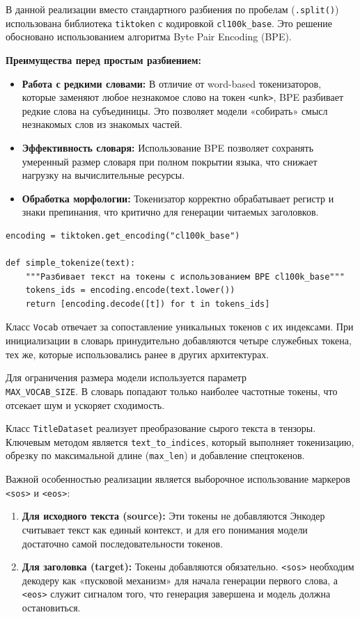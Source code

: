 \documentclass[coursework]{SCWorks}
\begin{document}
    В данной реализации вместо стандартного разбиения по пробелам (\texttt{.split()}) использована библиотека \texttt{tiktoken}
    с кодировкой \texttt{cl100k\_base}.
    Это решение обосновано использованием алгоритма Byte Pair Encoding (BPE).

    \textbf{Преимущества перед простым разбиением:}
    \begin{itemize}
        \item \textbf{Работа с редкими словами:} В отличие от word-based токенизаторов, которые заменяют любое незнакомое слово на токен \texttt{<unk>}, BPE разбивает редкие слова на субъединицы. Это позволяет модели «собирать» смысл незнакомых слов из знакомых частей.
        \item \textbf{Эффективность словаря:} Использование BPE позволяет сохранять умеренный размер словаря при полном покрытии языка, что снижает нагрузку на вычислительные ресурсы.
        \item \textbf{Обработка морфологии:} Токенизатор корректно обрабатывает регистр и знаки препинания, что критично для генерации читаемых заголовков.
    \end{itemize}

    \begin{verbatim}
encoding = tiktoken.get_encoding("cl100k_base")

def simple_tokenize(text):
    """Разбивает текст на токены с использованием BPE cl100k_base"""
    tokens_ids = encoding.encode(text.lower())
    return [encoding.decode([t]) for t in tokens_ids]
    \end{verbatim}

    Класс \texttt{Vocab} отвечает за сопоставление уникальных токенов с их индексами.
    При инициализации в словарь принудительно добавляются четыре служебных токена, тех же, которые использовались ранее в других архитектурах.

    Для ограничения размера модели используется параметр \\ \texttt{MAX\_VOCAB\_SIZE}.
    В словарь попадают только наиболее частотные токены, что отсекает шум и ускоряет сходимость.

    Класс \texttt{TitleDataset} реализует преобразование сырого текста в тензоры.
    Ключевым методом является \texttt{text\_to\_indices}, который выполняет токенизацию, обрезку по максимальной длине (\texttt{max\_len})
    и добавление спецтокенов.

    Важной особенностью реализации является выборочное использование маркеров \texttt{<sos>} и \texttt{<eos>}:
    \begin{enumerate}
        \item \textbf{Для исходного текста (source):} Эти токены не добавляются Энкодер считывает текст как единый контекст, и для его понимания модели достаточно самой последовательности токенов.
        \item \textbf{Для заголовка (target):} Токены добавляются обязательно. \texttt{<sos>} необходим декодеру как «пусковой механизм» для начала генерации первого слова, а \texttt{<eos>} служит сигналом того, что генерация завершена и модель должна остановиться.
    \end{enumerate}
\end{document}
